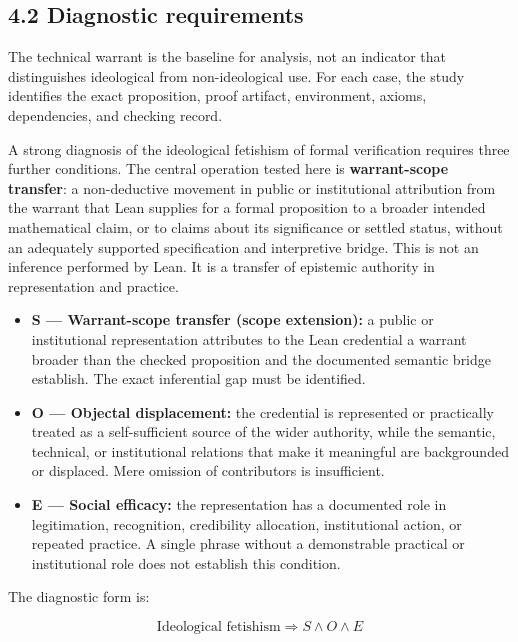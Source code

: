 \documentclass[sn-apa]{sn-jnl}
\begin{document}
\subsection{4.2 Diagnostic requirements}

The technical warrant is the baseline for analysis, not an indicator that distinguishes ideological from non-ideological use. For each case, the study identifies the exact proposition, proof artifact, environment, axioms, dependencies, and checking record.

A strong diagnosis of the ideological fetishism of formal verification requires three further conditions. The central operation tested here is \textbf{warrant-scope transfer}: a non-deductive movement in public or institutional attribution from the warrant that Lean supplies for a formal proposition to a broader intended mathematical claim, or to claims about its significance or settled status, without an adequately supported specification and interpretive bridge. This is not an inference performed by Lean. It is a transfer of epistemic authority in representation and practice.

\begin{itemize}

\item \textbf{S — Warrant-scope transfer (scope extension):} a public or institutional representation attributes to the Lean credential a warrant broader than the checked proposition and the documented semantic bridge establish. The exact inferential gap must be identified.

\item \textbf{O — Objectal displacement:} the credential is represented or practically treated as a self-sufficient source of the wider authority, while the semantic, technical, or institutional relations that make it meaningful are backgrounded or displaced. Mere omission of contributors is insufficient.

\item \textbf{E — Social efficacy:} the representation has a documented role in legitimation, recognition, credibility allocation, institutional action, or repeated practice. A single phrase without a demonstrable practical or institutional role does not establish this condition.

\end{itemize}

The diagnostic form is:

\[
\boxed{\text{Ideological fetishism} \Rightarrow S \land O \land E}
\]
\end{document}

